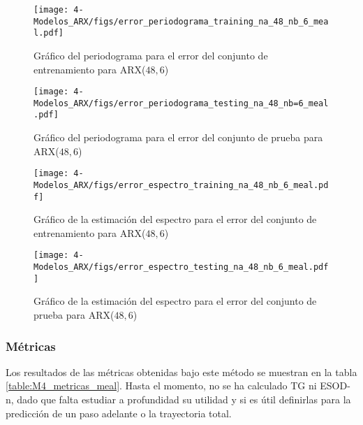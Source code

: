 \begin{figure}[H]
	\centering
	\texttt{[image: 4-Modelos\_ARX/figs/error\_periodograma\_training\_na\_48\_nb\_6\_meal.pdf]}
	\caption{Gráfico del periodograma para el error del conjunto de entrenamiento para ARX($48, 6$)}
	\label{fig:M4_error_periodograma_train_meal}
\end{figure}

\begin{figure}[H]
	\centering
	\texttt{[image: 4-Modelos\_ARX/figs/error\_periodograma\_testing\_na\_48\_nb=6\_meal.pdf]}
	\caption{Gráfico del periodograma para el error del conjunto de prueba para ARX($48, 6$)}
	\label{fig:M4_error_periodograma_test_meal}
\end{figure}

\begin{figure}[H]
	\centering
	\texttt{[image: 4-Modelos\_ARX/figs/error\_espectro\_training\_na\_48\_nb\_6\_meal.pdf]}
	\caption{Gráfico de la estimación del espectro para el error del conjunto de entrenamiento para ARX($48, 6$)}
	\label{fig:M4_error_espectro_train_meal}
\end{figure}

\begin{figure}[H]
	\centering
	\texttt{[image: 4-Modelos\_ARX/figs/error\_espectro\_testing\_na\_48\_nb\_6\_meal.pdf]}
	\caption{Gráfico de la estimación del espectro para el error del conjunto de prueba para ARX($48, 6$)}
	\label{fig:M4_error_espectro_test_meal}
\end{figure}

\subsubsection*{Métricas}

Los resultados de las métricas obtenidas bajo este método se muestran en la tabla \ref{table:M4_metricas_meal}. Hasta el momento, no se ha calculado TG ni ESOD-n, dado que falta estudiar a profundidad su utilidad y si es útil definirlas para la predicción de un paso adelante o la trayectoria total.

